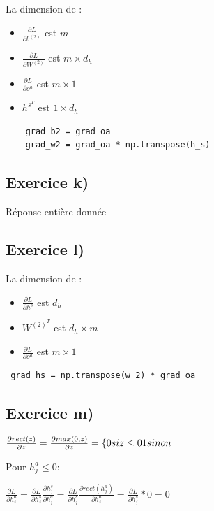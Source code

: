 \documentclass[a4paper,10pt]{article}
\begin{document}
La dimension de :
\begin{itemize}
	\item $\frac{\partial L}{\partial b^{(2)}}$ est $m$
	\item $\frac{\partial L}{\partial W^{(2)}}$ est $ m \times d_{h}$
	\item $\frac{\partial L}{\partial o^{a}}$ est $ m \times 1$
	\item $h^{s^T}$ est $ 1 \times d_{h}$
\end{itemize}

\begin{verbatim}
	grad_b2 = grad_oa
	grad_w2 = grad_oa * np.transpose(h_s)
\end{verbatim}

\subsection{Exercice k)}
Réponse entière donnée

\subsection{Exercice l)}

La dimension de :
\begin{itemize}
	\item $\frac{\partial L}{\partial h^{s}}$ est $d_{h}$
	\item $W^{(2)^T} $ est $d_{h} \times m$
	\item $\frac{\partial L}{\partial o^{a}}$ est $ m \times 1$
\end{itemize}

\begin{verbatim}
 grad_hs = np.transpose(w_2) * grad_oa	
\end{verbatim}

\subsection{Exercice m)}


$\frac{\partial rect(z)}{\partial z} = \frac{\partial max(0,z)}{\partial z} = \lbrace {0 si z \leq 0 \\ 1 sinon}$

Pour $h^a_j \leq 0$:

$\frac{\partial L}{\partial h^a_j} = \frac{\partial L}{\partial h^s_j} \frac{\partial h^s_j}{\partial h^a_j} = \frac{\partial L}{\partial h^s_j} \frac{\partial rect(h^a_j)}{\partial h^a_j} = \frac{\partial L}{\partial h^s_j}*0 = 0$
\end{document}
